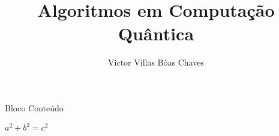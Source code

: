 \documentclass[comp]{bimer}
\author{Victor Villas Bôas Chaves}
\title{Algoritmos em Computação Quântica}
\date{\the\year}
\begin{document}
\printFrontMatter

\begin{frame}
\begin{block}{Bloco}
Conteúdo
\end{block}
\begin{theorem}[Pythagoras] 
$ a^2 + b^2 = c^2$
\end{theorem}
\end{frame}


\printBackMatter

\end{document}
